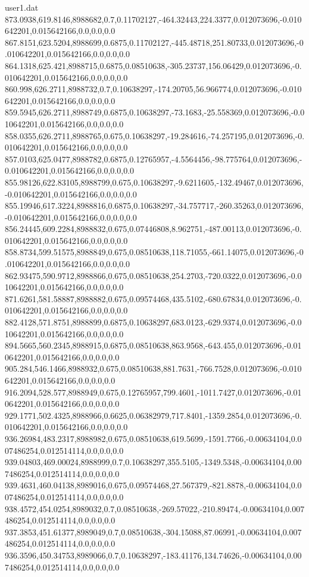 \begin{filecontents}{user1.dat}
873.0938,619.8146,8988682,0.7,0.11702127,-464.32443,224.3377,0.012073696,-0.010642201,0.015642166,0.0,0.0,0.0
867.8151,623.5204,8988699,0.6875,0.11702127,-445.48718,251.80733,0.012073696,-0.010642201,0.015642166,0.0,0.0,0.0
864.1318,625.421,8988715,0.6875,0.08510638,-305.23737,156.06429,0.012073696,-0.010642201,0.015642166,0.0,0.0,0.0
860.998,626.2711,8988732,0.7,0.10638297,-174.20705,56.966774,0.012073696,-0.010642201,0.015642166,0.0,0.0,0.0
859.5945,626.2711,8988749,0.6875,0.10638297,-73.1683,-25.558369,0.012073696,-0.010642201,0.015642166,0.0,0.0,0.0
858.0355,626.2711,8988765,0.675,0.10638297,-19.284616,-74.257195,0.012073696,-0.010642201,0.015642166,0.0,0.0,0.0
857.0103,625.0477,8988782,0.6875,0.12765957,-4.5564456,-98.775764,0.012073696,-0.010642201,0.015642166,0.0,0.0,0.0
855.98126,622.83105,8988799,0.675,0.10638297,-9.6211605,-132.49467,0.012073696,-0.010642201,0.015642166,0.0,0.0,0.0
855.19946,617.3224,8988816,0.6875,0.10638297,-34.757717,-260.35263,0.012073696,-0.010642201,0.015642166,0.0,0.0,0.0
856.24445,609.2284,8988832,0.675,0.07446808,8.962751,-487.00113,0.012073696,-0.010642201,0.015642166,0.0,0.0,0.0
858.8734,599.51575,8988849,0.675,0.08510638,118.71055,-661.14075,0.012073696,-0.010642201,0.015642166,0.0,0.0,0.0
862.93475,590.9712,8988866,0.675,0.08510638,254.2703,-720.0322,0.012073696,-0.010642201,0.015642166,0.0,0.0,0.0
871.6261,581.58887,8988882,0.675,0.09574468,435.5102,-680.67834,0.012073696,-0.010642201,0.015642166,0.0,0.0,0.0
882.4128,571.8751,8988899,0.6875,0.10638297,683.0123,-629.9374,0.012073696,-0.010642201,0.015642166,0.0,0.0,0.0
894.5665,560.2345,8988915,0.6875,0.08510638,863.9568,-643.455,0.012073696,-0.010642201,0.015642166,0.0,0.0,0.0
905.284,546.1466,8988932,0.675,0.08510638,881.7631,-766.7528,0.012073696,-0.010642201,0.015642166,0.0,0.0,0.0
916.2094,528.577,8988949,0.675,0.12765957,799.4601,-1011.7427,0.012073696,-0.010642201,0.015642166,0.0,0.0,0.0
929.1771,502.4325,8988966,0.6625,0.06382979,717.8401,-1359.2854,0.012073696,-0.010642201,0.015642166,0.0,0.0,0.0
936.26984,483.2317,8988982,0.675,0.08510638,619.5699,-1591.7766,-0.00634104,0.007486254,0.012514114,0.0,0.0,0.0
939.04803,469.00024,8988999,0.7,0.10638297,355.5105,-1349.5348,-0.00634104,0.007486254,0.012514114,0.0,0.0,0.0
939.4631,460.04138,8989016,0.675,0.09574468,27.567379,-821.8878,-0.00634104,0.007486254,0.012514114,0.0,0.0,0.0
938.4572,454.0254,8989032,0.7,0.08510638,-269.57022,-210.89474,-0.00634104,0.007486254,0.012514114,0.0,0.0,0.0
937.3853,451.61377,8989049,0.7,0.08510638,-304.15088,87.06991,-0.00634104,0.007486254,0.012514114,0.0,0.0,0.0
936.3596,450.34753,8989066,0.7,0.10638297,-183.41176,134.74626,-0.00634104,0.007486254,0.012514114,0.0,0.0,0.0

\end{filecontents}

